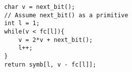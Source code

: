 \documentclass{subfiles}
\begin{document}
    \begin{figure*}[!hb]
        \centering
        \begin{subfigure}{0.35\textwidth}
            \centering
            \begin{lstlisting}
                char v = next_bit(); 
                // Assume next_bit() as a primitive
                int l = 1;
                while(v < fc[l]){
                    v = 2*v + next_bit();
                    l++;
                }
                return symb[l, v - fc[l]];
            \end{lstlisting}
        \end{subfigure}
    \end{figure*}
    \addtocounter{figure}{-1}
\end{document}
